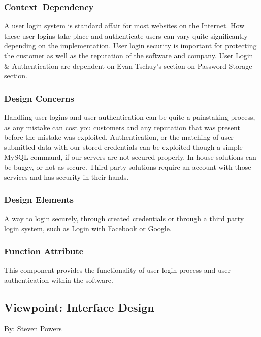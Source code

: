 \documentclass[letterpaper, 10pt, draftclsnofoot, compsoc, onecolumn]{IEEEtran}
\begin{document}
\subsubsection{Context--Dependency}
{\noindent A user login system is standard affair for most websites on the Internet.
How these user logins take place and authenticate users can vary quite
significantly depending on the implementation.
User login security is important for protecting the customer as well as
the reputation of the software and company. User Login \& Authentication
are dependent on Evan Tschuy's section on Password Storage section. \par}

\subsubsection{Design Concerns}
{\noindent Handling user logins and user authentication can be quite a painstaking process,
as any mistake can cost you customers and any reputation that was present
before the mistake was exploited. Authentication, or the matching of user submitted
data with our stored credentials can be exploited though a simple MySQL command,
if our servers are not secured properly. In house solutions can be buggy, or not as secure.
Third party solutions require an account with those services and has security in their hands. \par}

\subsubsection{Design Elements}
{\noindent A way to login securely, through created credentials or through a
third party login system, such as Login with Facebook or Google.  \par}

\subsubsection{Function Attribute}
{\noindent This component provides the functionality of user login process
and user authentication within the software.\par}



\subsection{Viewpoint: Interface Design}
{\noindent By: Steven Powers \par}
\end{document}
